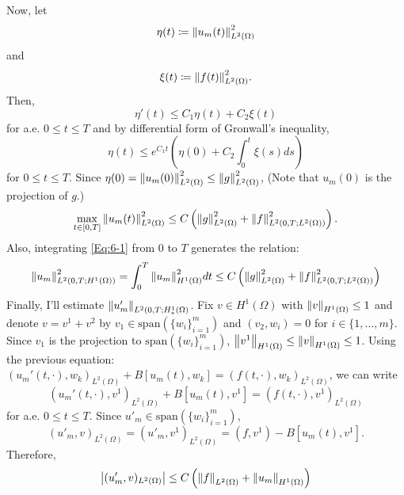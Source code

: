 \documentclass{article}
\begin{document}
\begin{enumerate}
Now, let 
\begin{equation*}
\eta(t)\coloneqq \norm{u_m(t)}^2_{L^2(\Omega)}
\end{equation*}
and
\begin{equation*}
\xi(t)\coloneqq \norm{f(t)}^2_{L^2(\Omega)}.
\end{equation*}
Then,
\begin{equation*}
\eta'(t)\leq C_1\eta(t)+C_2\xi(t)
\end{equation*}
for a.e. $0\leq t\leq T$ and by differential form of Gronwall's inequality,
\begin{equation*}
\eta(t)\leq e^{C_1t}\left(\eta(0)+C_2\int_0^t\xi(s)ds\right)
\end{equation*}
for $0\leq t\leq T$. Since $\eta(0)=\norm{u_m(0)}^2_{L^2(\Omega)}\leq \norm{g}^2_{L^2(\Omega)}$, (Note that $u_m(0)$ is the projection of $g$.)
\begin{equation*}
\max_{t\in[0,T]}\norm{u_m(t)}^2_{L^2(\Omega)}\leq C\left(\norm{g}^2_{L^2(\Omega)}+\norm{f}^2_{L^2(0, T; L^2(\Omega))}\right).
\end{equation*}
Also, integrating \eqref{Eq:6-1} from $0$ to $T$ generates the relation:
\begin{equation*}
\norm{u_m}^2_{L^2(0,T;H^1(\Omega))}=\int_0^T \norm{u_m}^2_{H^1(\Omega)}dt\leq C\left(\norm{g}^2_{L^2(\Omega)}+\norm{f}^2_{L^2(0, T; L^2(\Omega))}\right)
\end{equation*}
Finally, I'll estimate $\norm{u'_m}_{L^2(0,T;H^1_*(\Omega)}$. Fix $v\in H^1(\Omega)$ with $\norm{v}_{H^1(\Omega)}\leq 1$ and denote $v=v^1+v^2$ by $v_1\in \text{span}\left(\{w_i\}_{i=1}^m\right)$ and $(v_2,w_i)=0$ for $i\in \{1, \ldots, m\}$. Since $v_1$ is the projection to $\text{span}\left(\{w_i\}_{i=1}^m\right)$, $\norm{v^1}_{H^1(\Omega)}\leq \norm{v}_{H^1(\Omega)}\leq 1$. Using the previous equation: $(u_m'(t,\cdot),w_k)_{L^2(\Omega)}+B[u_m(t), w_k]=(f(t,\cdot), w_k)_{L^2(\Omega)}$, we can write
\begin{equation*}
(u_m'(t,\cdot),v^1)_{L^2(\Omega)}+B[u_m(t), v^1]=(f(t,\cdot), v^1)_{L^2(\Omega)}
\end{equation*}
for a.e. $0\leq t\leq T$. Since $u'_m\in \text{span}\left(\{w_i\}_{i=1}^m\right)$,
\begin{equation*}
(u'_m,v)_{L^2(\Omega)}=(u'_m,v^1)_{L^2(\Omega)}=(f,v^1)-B[u_m(t),v^1].
\end{equation*}
Therefore,
\begin{equation*}
\abs{(u'_m, v)_{L^2(\Omega)}}\leq C\left(\norm{f}_{L^2(\Omega)}+\norm{u_m}_{H^1(\Omega)}\right)
\end{equation*}

\end{enumerate}
\end{document}
